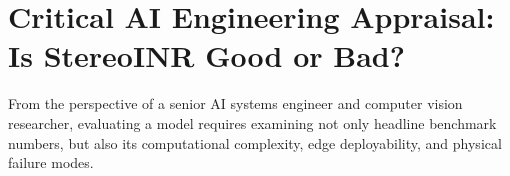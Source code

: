 \documentclass[10pt,journal,compsoc]{IEEEtran}
\begin{document}
\begin{table}[!b]
\caption{Ablation Study of Architectural Components on Middlebury.}
\label{tab:ablation_results}
\centering
{}
\end{table}

\section{Critical AI Engineering Appraisal: Is StereoINR Good or Bad?}

From the perspective of a senior AI systems engineer and computer vision researcher, evaluating a model requires examining not only headline benchmark numbers, but also its computational complexity, edge deployability, and physical failure modes.
\end{document}

